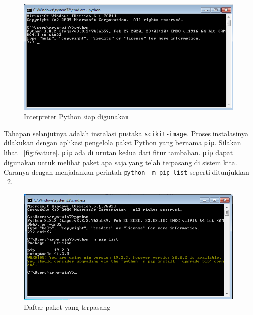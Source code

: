 \begin{figure}[h!]
  \begin{center}
    \includegraphics[scale=.5]{pics/pythonAktif.png}
    \caption{Interpreter Python siap digunakan}
    \label{fig:siap}
  \end{center}
\end{figure}

Tahapan selanjutnya adalah instalasi pustaka \texttt{scikit-image}. Proses instalasinya dilakukan dengan aplikasi pengelola paket Python yang bernama \texttt{pip}. Silakan lihat \figurename~\ref{fig:feature}. \texttt{pip} ada di urutan kedua dari fitur tambahan. \texttt{pip} dapat digunakan untuk melihat paket apa saja yang telah terpasang di sistem kita. Caranya dengan menjalankan perintah \texttt{python -m pip list} seperti ditunjukkan \figurename~\ref{fig:daftarPaket}.

\begin{figure}[h!]
  \begin{center}
    \includegraphics[scale=.5]{pics/pipList.png}
    \caption{Daftar paket yang terpasang}
    \label{fig:daftarPaket}
  \end{center}
\end{figure}

